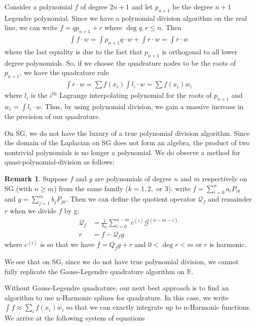 \documentclass[12pt]{amsart}
\theoremstyle{plain}
\theoremstyle{definition}
\newtheorem{remark}{Remark}[section]
\newcommand{\RR}{\mathbb{R}}
\begin{document}
Consider a polynomial $f$ of degree $2n+1$ and let $p_{n+1}$ be the degree $n+1$ Legendre polynomial. Since we have a polynomial division algorithm on the real line, we can write $f = qp_{n+1} + r$ where $\deg q, r \leq n$. Then
\begin{align}\label{eq:polydiv}
    \int f\cdot w = \int p_{n+1}q \cdot w+ \int r\cdot w = \int r\cdot w
\end{align}
where the last equality is due to the fact that $p_{n+1}$ is orthogonal to all lower degree polynomials. So, if we choose the quadrature nodes to be the roots of $p_{n+1}$, we have the quadrature rule
\begin{align}\label{eq:gaussquad}
    \int r\cdot w = \sum f(x_i) \int l_i\cdot w = \sum f(x_i) w_i
\end{align}
where $l_i$ is the $i^{\textrm{th}}$ Lagrange interpolating polynomial for the roots of $p_{n+1}$ and $w_i = \int l_i \cdot w$. Thus, by using polynomial division, we gain a massive increase in the precision of our quadrature. 

On SG, we do not have the luxury of a true polynomial division algorithm. Since the domain of the Laplacian on SG does not form an algebra, the product of two nontrivial polynomials is no longer a polynomial. We do observe a method for quasi-polynomial-division as follows:

\begin{remark}\label{rem:SGdivision}
Suppose $f$ and $g$ are polynomials of degree $n$ and $m$ respectively on SG (with $n \geq m$) from the same family ($k = 1, 2,$  or $3$). write $f = \sum\limits_{i = 0}^n a_iP_{ik}$ and $g = \sum\limits_{j=1}^m b_jP_{jk}$. Then we can define the quotient operator $\mathcal{Q}_f$ and remainder $r$ when we divide $f$ by g:
    \begin{align}\label{eq:SGdivision}
        \mathcal{Q}_f &= \frac{1}{b_m}
        \sum\limits_{i = 0}^{n-m}c^{(i)}\mathcal{G}^{(n-m-i)}\\
        r &= f - \mathcal{Q}_fg
    \end{align}
where $c^{(i)}$ is so that we have $f = Q_fg + r$ and $0 < \deg r < m$ or $r$ is harmonic.
\end{remark}
We see that on SG, since we do not have true polynomial division, we cannot fully replicate the Gauss-Legendre quadrature algorithm on $\RR$.

Without Gauss-Legendre quadrature, our next best approach is to find an algorithm to use n-Harmonic splines for quadrature. In this case, we write $\int f \approx \sum\limits_i f(x_i)w_i$ so that we can exactly integrate up to n-Harmonic functions. We arrive at the following system of equations
\end{document}
